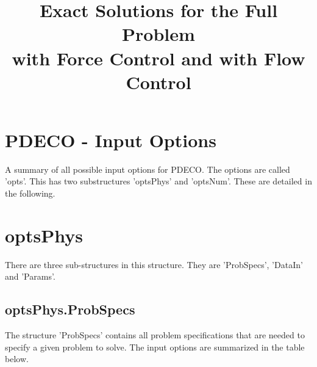 \documentclass[11pt, a4paper]{article}
\title{Exact Solutions for the Full Problem \\with Force Control and with Flow Control}
\date{}
\theoremstyle{definition}
\begin{document}
	
\section*{PDECO - Input Options}
A summary of all possible input options for PDECO. The options are called 'opts'. This has two substructures 'optsPhys' and 'optsNum'. These are detailed in the following.

\section{optsPhys}	
There are three sub-structures in this structure. They are 'ProbSpecs', 'DataIn' and 'Params'.
\subsection{optsPhys.ProbSpecs}
The structure 'ProbSpecs' contains all problem specifications that are needed to specify a given problem to solve. The input options are summarized in the table below.
\end{document}
